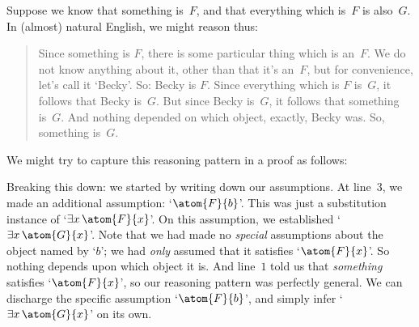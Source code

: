 Suppose we know that something is~$F$, and that everything which is~$F$ is also~$G$. In (almost) natural English, we might reason thus:
	\begin{quote}
		Since something is $F$, there is some particular thing which is an~$F$. We do not know anything about it, other than that it's an~$F$, but for convenience, let's call it `Becky'. So: Becky is $F$. Since everything which is $F$ is~$G$, it follows that Becky is~$G$. But since Becky is~$G$, it follows that something is~$G$. And nothing depended on which object, exactly, Becky was. So, something is~$G$.
	\end{quote}
We might try to capture this reasoning pattern in a proof as follows:
\begin{fitchproof}
	\PR
	\PR
	\open
		\AS
		 
	\close
\end{fitchproof}\noindent
Breaking this down: we started by writing down our assumptions. At line~$3$, we made an additional assumption: `$\atom{F}{b}$'. This was just a substitution instance of `$\exists x\,\atom{F}{x}$'. On this assumption, we established `$\exists x\,\atom{G}{x}$'. Note that we had made no \emph{special} assumptions about the object named by `$b$'; we had \emph{only} assumed that it satisfies `$\atom{F}{x}$'. So nothing depends upon which object it is. And line~$1$ told us that \emph{something} satisfies `$\atom{F}{x}$', so our reasoning pattern was perfectly general. We can discharge the specific assumption `$\atom{F}{b}$', and simply infer `$\exists x\,\atom{G}{x}$' on its own.

